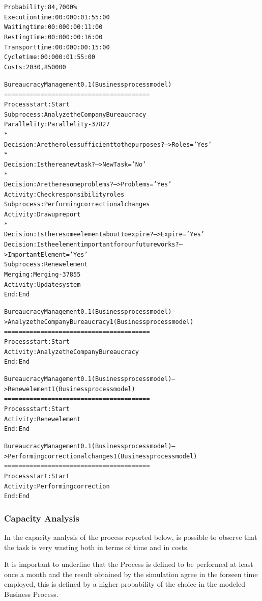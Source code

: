 \begin{alltt}
Probability:   84,7000\%
Execution time:  00:000:01:55:00
Waiting time:  00:000:00:11:00
Resting time:  00:000:00:16:00
Transport time:  00:000:00:15:00
Cycle time:  00:000:01:55:00
Costs:  2030,850000

Bureaucracy Management 0.1 (Business process model)
========================================
Process start: Start
Subprocess: Analyze the Company Bureaucracy
Parallelity: Parallelity-37827
    *
    Decision: Are the roles sufficient to the purposes? --> Roles='Yes'
    *
    Decision: Is there a new task? --> NewTask='No'
    *
    Decision: Are there some problems? --> Problems='Yes'
    Activity: Check responsibility roles
    Subprocess: Performing correctional changes
    Activity: Draw up report
    *
    Decision: Is there some element about to expire? --> Expire='Yes'
    Decision: Is the element important for our future works? --> ImportantElement='Yes'
    Subprocess: Renew element
Merging: Merging-37855
Activity: Update system
End: End

Bureaucracy Management 0.1 (Business process model) --> Analyze the Company Bureaucracy 1 (Business process model)
========================================
Process start: Start
Activity: Analyze the Company Bureaucracy
End: End

Bureaucracy Management 0.1 (Business process model) --> Renew element 1 (Business process model)
========================================
Process start: Start
Activity: Renew element
End: End

Bureaucracy Management 0.1 (Business process model) --> Performing correctional changes 1 (Business process model)
========================================
Process start: Start
Activity: Performing correction
End: End
\end{alltt}


\subsubsection{Capacity Analysis}
In the capacity analysis of the process reported below, is possible to observe that the task is very wasting both in terms of time and in costs.

It is important to underline that the Process is defined to be performed at least once a month and the result obtained by the simulation agree in the forseen time employed, this is defined by a higher probability of the choice in the modeled Business Process.


